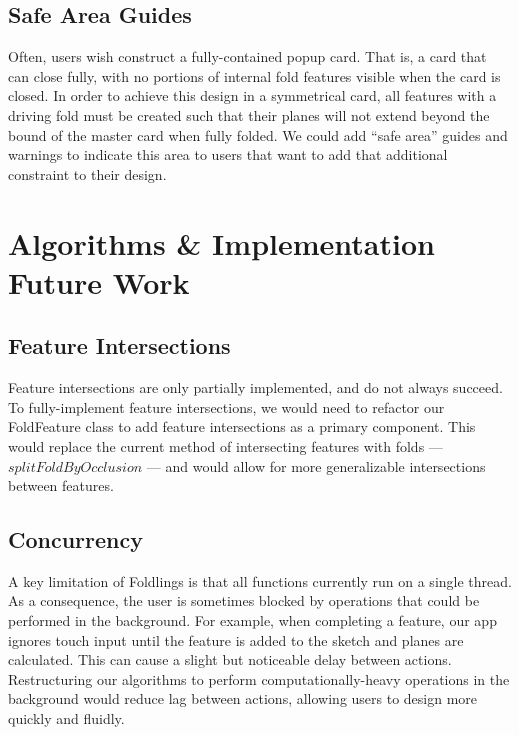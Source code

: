 \subsection{Safe Area Guides}\label{safe-area-guides}

Often, users wish construct a fully-contained popup card. That is, a
card that can close fully, with no portions of internal fold features
visible when the card is closed. In order to achieve this design in a
symmetrical card, all features with a driving fold must be created such
that their planes will not extend beyond the bound of the master card
when fully folded. We could add ``safe area'' guides and warnings to
indicate this area to users that want to add that additional constraint
to their design.

\section{Algorithms \& Implementation Future
Work}\label{algorithms-implementation-future-work}

\subsection{Feature Intersections}\label{feature-intersections}

Feature intersections are only partially implemented, and do not always
succeed. To fully-implement feature intersections, we would need to
refactor our FoldFeature class to add feature intersections as a primary
component. This would replace the current method of intersecting
features with folds --- \(splitFoldByOcclusion\) --- and would allow for
more generalizable intersections between features.

\subsection{Concurrency}\label{concurrency}

A key limitation of Foldlings is that all functions currently run on a
single thread. As a consequence, the user is sometimes blocked by
operations that could be performed in the background. For example, when
completing a feature, our app ignores touch input until the feature is
added to the sketch and planes are calculated. This can cause a slight
but noticeable delay between actions. Restructuring our algorithms to
perform computationally-heavy operations in the background would reduce
lag between actions, allowing users to design more quickly and fluidly.
